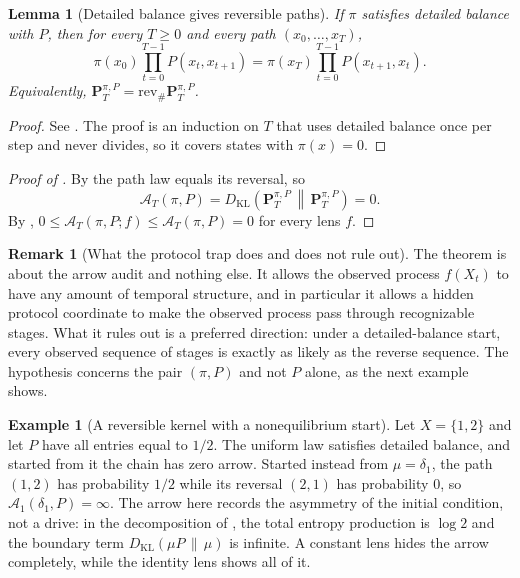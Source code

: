 \documentclass[11pt]{article}
\newtheorem{lemma}{Lemma}[section]
\theoremstyle{definition}
\newtheorem{remark}{Remark}[section]
\newtheorem{example}{Example}[section]
\newcommand{\rev}{\mathrm{rev}}
\newcommand{\1}{\mathbf{1}}
\newcommand{\thmNGArrowDPI}{\Cref{thm:NG_ARROW_DPI}}
\newcommand{\DKL}[2]{D_{\mathrm{KL}}\!\left(#1\,\middle\|\,#2\right)}
\newcommand{\Arr}{\mathcal{A}}
\begin{document}
\begin{lemma}[Detailed balance gives reversible paths]\label{lem:detailed_balance_path}
If $\pi$ satisfies detailed balance with $P$, then for every $T\ge 0$ and every path $(x_0,\dots,x_T)$,
\[
  \pi(x_0)\prod_{t=0}^{T-1}P(x_t,x_{t+1})=\pi(x_T)\prod_{t=0}^{T-1}P(x_{t+1},x_t).
\]
Equivalently, $\mathbf{P}^{\pi,P}_T=\rev_{\#}\mathbf{P}^{\pi,P}_T$.
\end{lemma}

\begin{proof}
See .
The proof is an induction on $T$ that uses detailed balance once per step and never divides, so it covers states with $\pi(x)=0$.
\end{proof}

\begin{proof}[Proof of ]
By  the path law equals its reversal, so
\[
  \Arr_T(\pi,P)=\DKL{\mathbf{P}^{\pi,P}_T}{\mathbf{P}^{\pi,P}_T}=0.
\]
By \thmNGArrowDPI, $0\le\Arr_T(\pi,P;f)\le\Arr_T(\pi,P)=0$ for every lens $f$.
\end{proof}

\begin{remark}[What the protocol trap does and does not rule out]\label{rem:protocol_trap_reading}
The theorem is about the arrow audit and nothing else.
It allows the observed process $f(X_t)$ to have any amount of temporal structure, and in particular it allows a hidden protocol coordinate to make the observed process pass through recognizable stages.
What it rules out is a preferred direction: under a detailed-balance start, every observed sequence of stages is exactly as likely as the reverse sequence.
The hypothesis concerns the pair $(\pi,P)$ and not $P$ alone, as the next example shows.
\end{remark}

\begin{example}[A reversible kernel with a nonequilibrium start]\label{ex:transient_arrow}
Let $X=\{1,2\}$ and let $P$ have all entries equal to $1/2$.
The uniform law satisfies detailed balance, and started from it the chain has zero arrow.
Started instead from $\mu=\delta_1$, the path $(1,2)$ has probability $1/2$ while its reversal $(2,1)$ has probability $0$, so $\Arr_1(\delta_1,P)=\infty$.
The arrow here records the asymmetry of the initial condition, not a drive: in the decomposition of , the total entropy production is $\log 2$ and the boundary term $\DKL{\mu P}{\mu}$ is infinite.
A constant lens hides the arrow completely, while the identity lens shows all of it.
\end{example}
\end{document}
